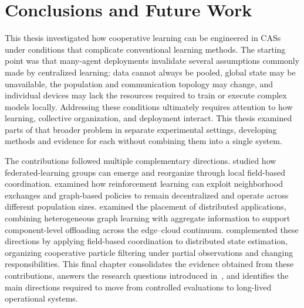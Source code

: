 
\chapter{Conclusions and Future Work}
\label{chap:wrapup}
\minitoc

This thesis investigated how cooperative learning can be engineered
 in \glspl{CAS} under conditions that complicate conventional learning methods.
%
The starting point was that many-agent deployments invalidate several assumptions 
 commonly made by centralized learning: 
 data cannot always be pooled, global state may be unavailable, 
 the population and communication topology may change, 
 and individual devices may lack the resources required to train or execute complex models locally.
%
Addressing these conditions ultimately requires attention to how learning,
 collective organization, and deployment interact.
%
This thesis examined parts of that broader problem in separate experimental settings,
 developing methods and evidence for each without combining them into a single system.

The contributions followed multiple complementary directions.
%
 studied how federated-learning groups can emerge 
 and reorganize through local field-based coordination.
%
 examined how reinforcement learning can exploit neighborhood exchanges
 and graph-based policies to remain decentralized and operate across different population sizes.
%
 examined the placement of distributed applications,
 combining heterogeneous graph learning with aggregate information to support component-level offloading 
 across the edge--cloud continuum.
%
 complemented these directions
 by applying field-based coordination to distributed state estimation,
 organizing cooperative particle filtering under partial observations and changing responsibilities.
%
This final chapter consolidates the evidence obtained from these contributions,
 answers the research questions introduced in~, 
 and identifies the main directions required to move from controlled evaluations 
 to long-lived operational systems.


